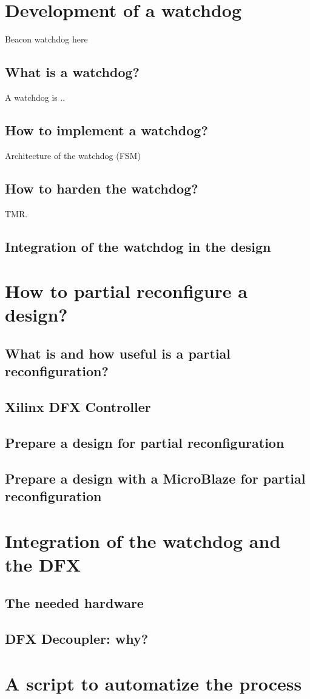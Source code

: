 \section{Development of a watchdog}

Beacon watchdog here

\subsection{What is a watchdog?}

A watchdog is ..

\subsection{How to implement a watchdog?}

Architecture of the watchdog (FSM)

\subsection{How to harden the watchdog?}

TMR.

\subsection{Integration of the watchdog in the design}

\section{How to partial reconfigure a design?}
\subsection{What is and how useful is a partial reconfiguration?}
\subsection{Xilinx DFX Controller}
\subsection{Prepare a design for partial reconfiguration}
\subsection{Prepare a design with a MicroBlaze for partial reconfiguration}

\section{Integration of the watchdog and the DFX}
\subsection{The needed hardware}
\subsection{DFX Decoupler: why?}

\section{A script to automatize the process}
